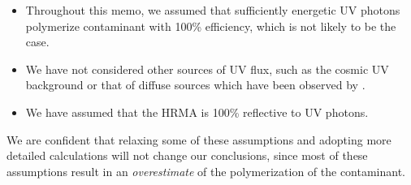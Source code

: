 \documentclass[11pt]{article}
\begin{document}
\begin{itemize}
\item Throughout this memo, we assumed that sufficiently energetic UV photons polymerize contaminant with 100\% efficiency, which is not likely to be the case.
\item We have not considered other sources of UV flux, such as the cosmic UV background or that of diffuse sources which have been observed by \chandra.
\item We have assumed that the HRMA is 100\% reflective to UV photons.
\end{itemize}

We are confident that relaxing some of these assumptions and adopting more detailed calculations will not change our conclusions, since most of these assumptions result in an {\it overestimate} of the polymerization of the contaminant.
\end{document}
